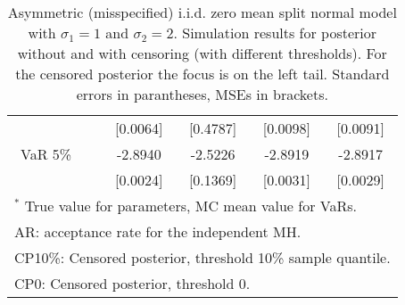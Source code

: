 {\begin{table}
\begin{tabular}{cc cccc}
  && [0.0064] & [0.4787] & [0.0098] & [0.0091]  \\ 
VaR 5\% && -2.8940 & -2.5226 & -2.8919 & -2.8917  \\ 
 && [0.0024] & [0.1369] & [0.0031] & [0.0029]  \\ 
\hline 
\multicolumn{6}{l}{\footnotesize{$^*$ True value for parameters, MC mean value for VaRs.}}  \\ 
\multicolumn{6}{l}{\footnotesize{AR: acceptance rate for the independent MH.}}  \\ 
\multicolumn{6}{l}{\footnotesize{CP10\%: Censored posterior, threshold 10\% sample quantile.}}  \\ 
\multicolumn{6}{l}{\footnotesize{CP0: Censored posterior, threshold 0.}} 
\end{tabular}
 \caption{Asymmetric (misspecified) i.i.d. zero mean split normal model with $\sigma_{1} = 1$ and $\sigma_{2} = 2$. Simulation results for posterior without and with censoring (with different thresholds). For the censored posterior the focus is on the left tail. Standard errors in parantheses, MSEs in brackets.} 
\label{tab:iid}  
\end{table}
}